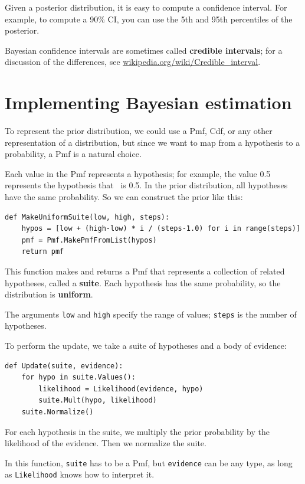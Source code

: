 \documentclass[12pt]{book}
\begin{document}
Given a posterior distribution, it is easy to compute a confidence
interval.  For example, to compute a 90\% CI, you can
use the 5th and 95th percentiles of the posterior.

Bayesian confidence intervals are sometimes called {\bf credible
intervals}; for a discussion of the differences, see
\url{wikipedia.org/wiki/Credible_interval}.


\section{Implementing Bayesian estimation}

To represent the prior distribution, we could use a Pmf, Cdf, or
any other representation of a distribution, but since we want to
map from a hypothesis to a probability, a Pmf is a natural choice.

Each value in the Pmf represents a hypothesis; for example, the
value 0.5 represents the hypothesis that \mylambda~is 0.5.
In the prior distribution, all hypotheses have the same probability.
So we can construct the prior like this:
%
\begin{verbatim}
def MakeUniformSuite(low, high, steps):
    hypos = [low + (high-low) * i / (steps-1.0) for i in range(steps)]
    pmf = Pmf.MakePmfFromList(hypos)
    return pmf
\end{verbatim}

This function makes and returns a Pmf that represents a 
collection of related hypotheses, called a {\bf suite}.  Each hypothesis
has the same probability, so the distribution is {\bf uniform}.

The arguments {\tt low} and {\tt high} specify the range of values;
{\tt steps} is the number of hypotheses.

To perform the update, we take a suite of hypotheses and a body of
evidence:
%
\begin{verbatim}
def Update(suite, evidence):
    for hypo in suite.Values():
        likelihood = Likelihood(evidence, hypo)
        suite.Mult(hypo, likelihood)
    suite.Normalize()
\end{verbatim}

For each hypothesis in the suite, we multiply the prior probability
by the likelihood of the evidence.  Then we normalize the suite.

In this function, {\tt suite} has to be a Pmf, but {\tt evidence}
can be any type, as long as {\tt Likelihood} knows how to interpret it.
\end{document}
